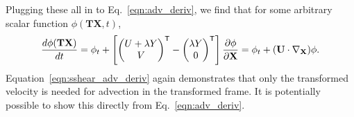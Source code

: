 \documentclass[11pt]{article}
\newcommand{\p}{\partial}
\newcommand{\bT}{\mathbf{T}}
\newcommand{\bU}{\mathbf{U}}
\newcommand{\bX}{\mathbf{X}}
\newcommand{\Trans}{\mathsf{T}}
\begin{document}
Plugging these all in to Eq.~\ref{eqn:adv_deriv}, we find that for some arbitrary scalar function $\phi(\bT\bX, t)$,
\begin{equation}
\frac{d\phi(\bT\bX)}{dt} = \phi_t + \left[ \begin{pmatrix}U + \lambda Y\\ V \end{pmatrix}^\Trans - \begin{pmatrix}\lambda Y \\ 0\end{pmatrix}^\Trans\right]\frac{\p\phi}{\p \bX}\nonumber\\
    = \phi_t + (\bU\cdot\nabla_\bX)\phi.
    \label{eqn:sshear_adv_deriv}
\end{equation}
Equation~\ref{eqn:sshear_adv_deriv} again demonstrates that only the transformed velocity is needed for advection in the transformed frame. It is potentially possible to show this directly from Eq.~\ref{eqn:adv_deriv}.
\end{document}

